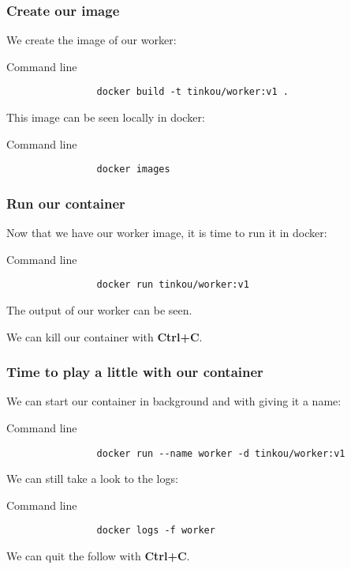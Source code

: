 	\begin{frame}[fragile]
		\frametitle{Create our image}
		
		We create the image of our worker:
		
		\begin{block}{Command line}
			\begin{verbatim}
				docker build -t tinkou/worker:v1 .
			\end{verbatim}
		\end{block}
		
		This image can be seen locally in docker:

		\begin{block}{Command line}
			\begin{verbatim}
				docker images
			\end{verbatim}
		\end{block}
		
	\end{frame}
	
	\begin{frame}[fragile]
		\frametitle{Run our container}
		
		Now that we have our worker image, it is time to run it in docker:
		
		\begin{block}{Command line}
			\begin{verbatim}
				docker run tinkou/worker:v1
			\end{verbatim}
		\end{block}
		The output of our worker can be seen.
		
		We can kill our container with \textbf{Ctrl+C}.
		
	\end{frame}
	
	\begin{frame}[fragile]
		\frametitle{Time to play a little with our container}
		
		We can start our container in background and with giving it a name:
		\begin{block}{Command line}
			\begin{verbatim}
				docker run --name worker -d tinkou/worker:v1
			\end{verbatim}
		\end{block}
		
		\bigskip
		We can still take a look to the logs:
		\begin{block}{Command line}
			\begin{verbatim}
				docker logs -f worker
			\end{verbatim}
		\end{block}
		We can quit the follow with \textbf{Ctrl+C}.

	\end{frame}
	
